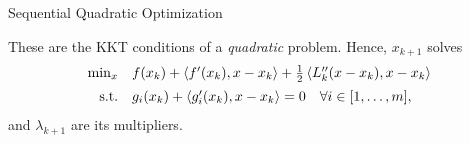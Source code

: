 \documentclass[9pt]{beamer}
\begin{document}
\begin{frame}{Sequential Quadratic Optimization}

  These are the KKT conditions of a \emph{quadratic} problem. Hence, $x_{k+1}$ solves
  \[
    \begin{array}{rl}
      \min_{x} & f(x_k) + \left<f'(x_k), x-x_k\right>+\frac 12 \left<L''_k(x-x_k), x-x_k\right> \\[0.5em]
      \mathrm{s.t.} & g_i(x_k) + \left<g_i'(x_k), x-x_k\right> = 0 \quad \forall i\in [1, \dots, m],
    \end{array}
  \]
  and $\lambda_{k+1}$ are its multipliers.
  

  \vfill


\end{frame}
\end{document}
